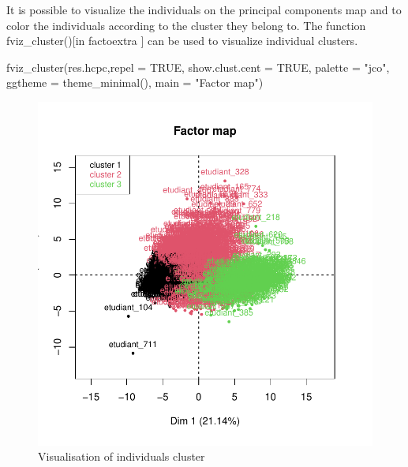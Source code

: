 \documentclass[12pt]{article}
\begin{document}
It is possible to visualize the individuals on the principal components map and to color the individuals according to the cluster they belong to. The function fviz\_cluster()[in factoextra ] can be used to visualize individual clusters.

\begin{customFrame}

fviz_cluster(res.hcpc,repel = TRUE,            
             show.clust.cent = TRUE, 
             palette = "jco",         
             ggtheme = theme_minimal(),
             main = "Factor map")
             
\end{customFrame}

\begin{figure}[H]
\begin{center}
\includegraphics[scale=1.]{HCPC.pdf} 
\caption[]{Visualisation of  individuals cluster }
\end{center}
\end{figure}
\end{document}
